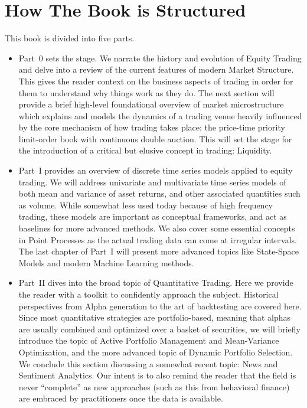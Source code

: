\section{How The Book is Structured}

This book is divided into five parts. 

\begin{itemize}
\item Part~0 sets the stage. We narrate the history and evolution of Equity Trading and delve into a review of the current features of modern Market Structure. This gives the reader context on the business aspects of trading in order for them to understand why things work as they do. The next section will provide a brief high-level foundational overview of market microstructure which explains and models the dynamics of a trading venue heavily influenced by the core mechanism of how trading takes place: the price-time priority limit-order book with continuous double auction. This will set the stage for the introduction of a critical but elusive concept in trading: Liquidity.

\item Part~I provides an overview of discrete time series models applied to equity trading. We will address univariate and multivariate time series models of both mean and variance of asset returns, and other associated quantities such as volume. While somewhat less used today because of high frequency trading, these models are important  as conceptual frameworks, and act as baselines for more advanced methods. We also cover some essential concepts in Point Processes as the actual trading data can come at irregular intervals. The last chapter of Part~I will present more advanced topics like State-Space Models and modern Machine Learning methods.

\item Part~II dives into the broad topic of Quantitative Trading. Here we provide the reader with a toolkit to confidently approach the subject. Historical perspectives from Alpha generation to the art of backtesting are covered here. Since most quantitative strategies are portfolio-based, meaning that alphas are usually combined  and optimized over a basket of securities, we will briefly introduce the topic of Active Portfolio Management and Mean-Variance Optimization, and the more advanced topic of Dynamic Portfolio Selection. We conclude this section discussing a somewhat recent topic:  News and Sentiment Analytics. Our intent is to also remind the reader that the field is never ``complete'' as new approaches (such as this from behavioral finance) are embraced by practitioners once the data is available.


\end{itemize}
